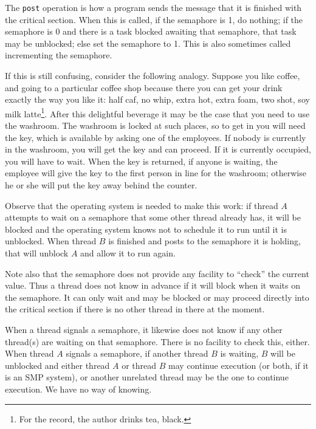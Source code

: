The \texttt{post} operation is how a program sends the message that it is finished with the critical section. When this is called, if the semaphore is 1, do nothing; if the semaphore is 0 and there is a task blocked awaiting that semaphore, that task may be unblocked; else set the semaphore to 1. This is also sometimes called incrementing the semaphore.

If this is still confusing, consider the following analogy. Suppose you like coffee, and going to a particular coffee shop because there you can get your drink exactly the way you like it: half caf, no whip, extra hot, extra foam, two shot, soy milk latte\footnote{For the record, the author drinks tea, black.}. After this delightful beverage it may be the case that you need to use the washroom. The washroom is locked at such places, so to get in you will need the key, which is available by asking one of the employees. If nobody is currently in the washroom, you will get the key and can proceed. If it is currently occupied, you will have to wait. When the key is returned, if anyone is waiting, the employee will give the key to the first person in line for the washroom; otherwise he or she will put the key away behind the counter.

Observe that the operating system is needed to make this work: if thread $A$ attempts to wait on a semaphore that some other thread already has, it will be blocked and the operating system knows not to schedule it to run until it is unblocked. When thread $B$ is finished and posts to the semaphore it is holding, that will unblock $A$ and allow it to run again.

Note also that the semaphore does not provide any facility to ``check'' the current value. Thus a thread does not know in advance if it will block when it waits on the semaphore. It can only wait and may be blocked or may proceed directly into the critical section if there is no other thread in there at the moment.

When a thread signals a semaphore, it likewise does not know if any other thread(s) are waiting on that semaphore. There is no facility to check this, either. When thread $A$ signals a semaphore, if another thread $B$ is waiting, $B$ will be unblocked and either thread $A$ or thread $B$ may continue execution (or both, if it is an SMP system), or another unrelated thread may be the one to continue execution. We have no way of knowing.

